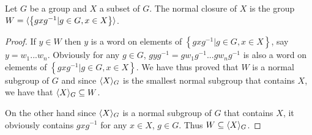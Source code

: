 \begin{theorem}
    Let $G$ be a group and $X$ a subset of $G$. The normal closure of $X$ is the group $W = \langle \left\{gxg^{-1}|g \in G, x \in X\right\} \rangle$. 
\end{theorem}

\begin{proof}
    If $y \in W$ then $y$ is a word on elements of $\left\{gxg^{-1}|g \in G, x \in X\right\}$, say $y = w_1...w_n$. Obviously for any $g \in G$, $gyg^{-1} =gw_1g^{-1}...gw_ng^{-1}$ is also a word on elements of $\left\{gxg^{-1}|g \in G, x \in X\right\}$. We have thus proved that $W$ is a normal subgroup of $G$ and since $\langle X \rangle_G$ is the smallest normal subgroup that contains $X$, we have that $\langle X \rangle_G \subseteq W$.
    
    On the other hand since $\langle X \rangle_G$ is a normal subgroup of $G$ that contains $X$, it obviously contains $gxg^{-1}$ for any $x \in X$, $g \in G$. Thus $W \subseteq \langle X \rangle_G$.
\end{proof}